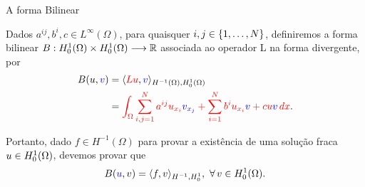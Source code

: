 \begin{frame}{A forma Bilinear}
\begin{defin}
Dados \(a^{ij},b^i, c\in L^\infty(\Omega)\), para quaisquer \(i,j\in \{1,\ldots,N\}\), definiremos a forma bilinear {\color{blue}\(B:H_0^1(\Omega)\times H_0^1(\Omega)\longrightarrow \mathbb{R}\) associada ao operador {\color{red}L} na forma divergente}, por 
\begin{align*}
B(u,{\color{blue}v})& =\langle{\color{red}Lu},{\color{blue}v}\rangle_{H^{-1}(\Omega),H_0^1(\Omega)}\\
& ={\color{red}\int_\Omega \sum_{i,j=1}^{N} a^{ij}u_{x_i}{\color{blue}v_{x_j}}
+\sum_{i=1}^{N} b^iu_{x_i}{\color{blue}v}+cu{\color{blue}v}\,dx}.
\end{align*}
\end{defin}
Portanto, dado {\color{red} \(f\in H^{-1}(\Omega)\)} para provar a existência de uma solução fraca {\color{blue}\(u\in H_0^1(\Omega)\)}, devemos provar que 
{\color{red}
\[B({\color{blue}u},{\color{black}v})=\innp{f,{\color{black}v}}_{H^{-1},H_0^1},\ \forall\, {\color{black} v}\in \ho.\]
}
\end{frame}
%
%
